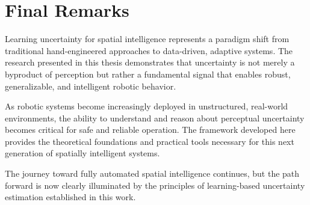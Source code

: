 \section{Final Remarks}

Learning uncertainty for spatial intelligence represents a paradigm shift from traditional hand-engineered approaches to data-driven, adaptive systems. The research presented in this thesis demonstrates that uncertainty is not merely a byproduct of perception but rather a fundamental signal that enables robust, generalizable, and intelligent robotic behavior.

As robotic systems become increasingly deployed in unstructured, real-world environments, the ability to understand and reason about perceptual uncertainty becomes critical for safe and reliable operation. The framework developed here provides the theoretical foundations and practical tools necessary for this next generation of spatially intelligent systems.

The journey toward fully automated spatial intelligence continues, but the path forward is now clearly illuminated by the principles of learning-based uncertainty estimation established in this work.
